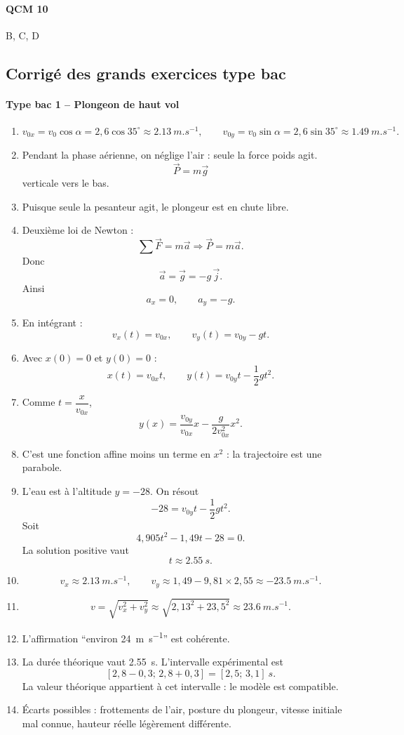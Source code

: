 \documentclass[11pt,a4paper]{article}
\theoremstyle{definition}
\begin{document}
\paragraph{QCM 10} B, C, D

\subsection{Corrigé des grands exercices type bac}

\paragraph{Type bac 1 -- Plongeon de haut vol}
\begin{enumerate}[label=\arabic*.]
    \item
    \[
    v_{0x}=v_0\cos\alpha=2,6\cos 35^\circ \approx \SI{2,13}{m.s^{-1}},
    \qquad
    v_{0y}=v_0\sin\alpha=2,6\sin 35^\circ \approx \SI{1,49}{m.s^{-1}}.
    \]
    \item Pendant la phase aérienne, on néglige l’air : seule la force poids agit.
    \[
    \vec P = m\vec g
    \]
    verticale vers le bas.
    \item Puisque seule la pesanteur agit, le plongeur est en chute libre.
    \item Deuxième loi de Newton :
    \[
    \sum \vec F = m\vec a \Rightarrow \vec P = m\vec a.
    \]
    Donc
    \[
    \vec a = \vec g = -g\,\vec j.
    \]
    Ainsi
    \[
    a_x=0,\qquad a_y=-g.
    \]
    \item En intégrant :
    \[
    v_x(t)=v_{0x},\qquad v_y(t)=v_{0y}-gt.
    \]
    \item Avec $x(0)=0$ et $y(0)=0$ :
    \[
    x(t)=v_{0x}t,\qquad y(t)=v_{0y}t-\frac12 gt^2.
    \]
    \item Comme $t=\dfrac{x}{v_{0x}}$,
    \[
    y(x)=\frac{v_{0y}}{v_{0x}}x-\frac{g}{2v_{0x}^2}x^2.
    \]
    \item C’est une fonction affine moins un terme en $x^2$ : la trajectoire est une parabole.
    \item L’eau est à l’altitude $y=-28$. On résout
    \[
    -28=v_{0y}t-\frac12 gt^2.
    \]
    Soit
    \[
    4,905t^2-1,49t-28=0.
    \]
    La solution positive vaut
    \[
    t \approx \SI{2,55}{s}.
    \]
    \item
    \[
    v_x \approx \SI{2,13}{m.s^{-1}},
    \qquad
    v_y \approx 1,49-9,81\times 2,55 \approx \SI{-23,5}{m.s^{-1}}.
    \]
    \item
    \[
    v=\sqrt{v_x^2+v_y^2}\approx \sqrt{2,13^2+23,5^2}\approx \SI{23,6}{m.s^{-1}}.
    \]
    \item L’affirmation “environ \SI{24}{m.s^{-1}}” est cohérente.
    \item La durée théorique vaut \SI{2,55}{s}. L’intervalle expérimental est
    \[
    [2,8-0,3;\,2,8+0,3]=[2,5;\,3,1]\ \si{s}.
    \]
    La valeur théorique appartient à cet intervalle : le modèle est compatible.
    \item Écarts possibles : frottements de l’air, posture du plongeur, vitesse initiale mal connue, hauteur réelle légèrement différente.
\end{enumerate}
\end{document}
